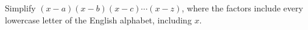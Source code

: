 Simplify $(x-a)(x-b)(x-c)\cdots(x-z)$, where the factors include every lowercase letter of the English alphabet, including $x$.
